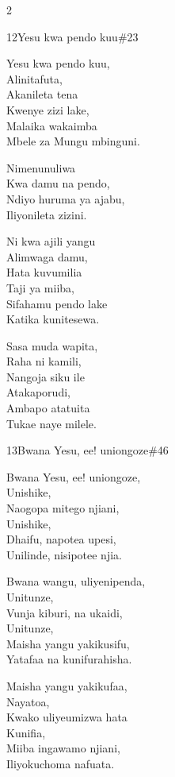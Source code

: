 \documentclass{article}
\begin{document}
\begin{multicols}{2}
\begin{hymn}{12}{Yesu kwa pendo kuu}{\#23}
\begin{stanza}
Yesu kwa pendo kuu,\\
Alinitafuta,\\
Akanileta tena\\
Kwenye zizi lake,\\
Malaika wakaimba\\
Mbele za Mungu mbinguni.
\end{stanza}
\begin{chorus}
Nimenunuliwa\\
Kwa damu na pendo,\\
Ndiyo huruma ya ajabu,\\
Iliyonileta zizini.
\end{chorus}
\begin{stanza}
Ni kwa ajili yangu\\
Alimwaga damu,\\
Hata kuvumilia\\
Taji ya miiba,\\
Sifahamu pendo lake\\
Katika kunitesewa.
\end{stanza}
\begin{stanza}
Sasa muda wapita,\\
Raha ni kamili,\\
Nangoja siku ile\\
Atakaporudi,\\
Ambapo atatuita\\
Tukae naye milele.
\end{stanza}
\end{hymn}

\begin{hymn}{13}{Bwana Yesu, ee! uniongoze}{\#46}
\begin{stanza}
Bwana Yesu, ee! uniongoze,\\
Unishike,\\
Naogopa mitego njiani,\\
Unishike,\\
Dhaifu, napotea upesi,\\
Unilinde, nisipotee njia.
\end{stanza}
\begin{stanza}
Bwana wangu, uliyenipenda,\\
Unitunze,\\
Vunja kiburi, na ukaidi,\\
Unitunze,\\
Maisha yangu yakikusifu,\\
Yatafaa na kunifurahisha.
\end{stanza}
\begin{stanza}
Maisha yangu yakikufaa,\\
Nayatoa,\\
Kwako uliyeumizwa hata\\
Kunifia,\\
Miiba ingawamo njiani,\\
Iliyokuchoma nafuata.
\end{stanza}
\end{hymn}


\end{multicols}
\end{document}
